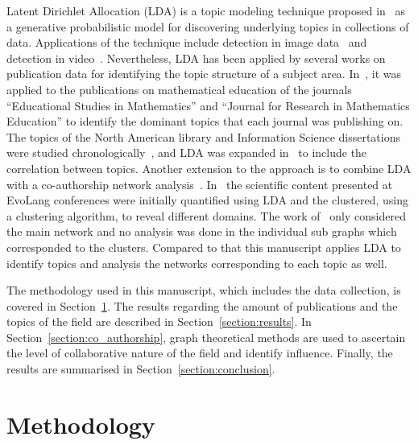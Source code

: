 \documentclass{article}
\theoremstyle{definition}
\begin{document}
Latent Dirichlet Allocation (LDA) is a topic modeling technique proposed
in~\cite{Blei2003} as a generative probabilistic model for discovering
underlying topics in collections of data.
Applications of the technique include detection in image data~\cite{Agarwal2008,
Coelho2010} and detection in video~\cite{Niebles2008, Wang2008}. Nevertheless,
LDA has been applied by several works on publication data for identifying the
topic structure of a subject area. In~\cite{Inglis2018}, it was applied to the
publications on mathematical education of the journals ``Educational Studies in
Mathematics'' and ``Journal for Research in Mathematics Education'' to
identify the dominant topics that each journal was publishing on. The topics of
the North American library and Information Science dissertations were 
studied chronologically~\cite{Sugimoto2011}, and LDA was expanded in~\cite{Blei2007}
to include the correlation between topics. Another extension to the approach
is to combine LDA with a co-authorship network analysis~\cite{Bergmann2018}.
In~\cite{Bergmann2018} the scientific content presented at EvoLang conferences
were initially quantified using LDA and the clustered, using a clustering
algorithm, to reveal different domains. The work of~\cite{Bergmann2018} only
considered the main network and no analysis was done in the individual sub graphs
which corresponded to the clusters. Compared to that this manuscript applies
LDA to identify topics and analysis the networks corresponding to each topic
as well.

The methodology
used in this manuscript, which includes the data collection, is covered in
Section~\ref{section:methodology}. The results regarding the amount of
publications and the topics of the field are described in
Section~\ref{section:results}. In Section~\ref{section:co_authorship}, graph
theoretical methods are used to ascertain the level of collaborative nature of
the field and identify influence. Finally, the results are summarised in
Section~\ref{section:conclusion}.

\section{Methodology}\label{section:methodology}
\end{document}
